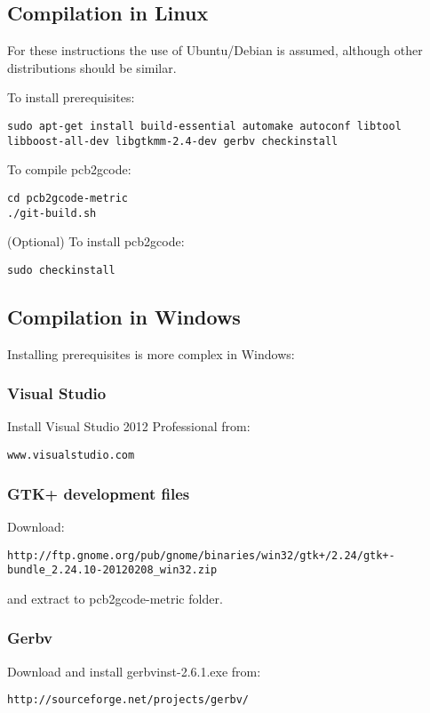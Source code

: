 \documentclass[a4paper,11pt]{article}  %
\begin{document}
\subsection{Compilation in Linux}
For these instructions the use of Ubuntu/Debian is assumed, although other distributions should be similar.

To install prerequisites:
\begin{lstlisting}[frame=single,breaklines=true]
sudo apt-get install build-essential automake autoconf libtool libboost-all-dev libgtkmm-2.4-dev gerbv checkinstall
\end{lstlisting}

To compile pcb2gcode:
\begin{lstlisting}[frame=single,breaklines=true]
cd pcb2gcode-metric
./git-build.sh
\end{lstlisting}

(Optional) To install pcb2gcode:
\begin{lstlisting}[frame=single,breaklines=true]
sudo checkinstall
\end{lstlisting}

\subsection{Compilation in Windows}
Installing prerequisites is more complex in Windows:

\subsubsection{Visual Studio}
Install Visual Studio 2012 Professional from:
\begin{lstlisting}[frame=single,breaklines=true]
www.visualstudio.com
\end{lstlisting}

\subsubsection{GTK+ development files}
Download:
\begin{lstlisting}[frame=single,breaklines=true]
http://ftp.gnome.org/pub/gnome/binaries/win32/gtk+/2.24/gtk+-bundle_2.24.10-20120208_win32.zip
\end{lstlisting}
and extract to pcb2gcode-metric folder.

\subsubsection{Gerbv}
Download and install gerbvinst-2.6.1.exe from:
\begin{lstlisting}[frame=single,breaklines=true]
http://sourceforge.net/projects/gerbv/
\end{lstlisting}
\end{document}
